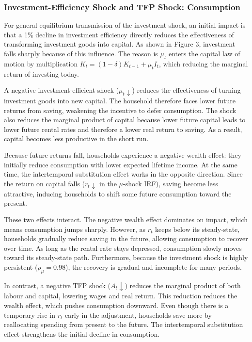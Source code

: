 \documentclass[12pt]{article}
\begin{document}
\subsubsection{Investment-Efficiency Shock and TFP Shock: Consumption}
For general equilibrium transmission of the investment shock, an initial impact is that a 1\% decline in investment efficiency directly reduces the effectiveness of transforming investment goods into capital. As shown in Figure 3, investment falls sharply because of this influence. The reason is $\mu_t$ enters the capital law of motion by multiplication $K_{t} = (1-\delta) K_{t-1} + \mu_t I_t$, which reducing the marginal return of investing today.

A negative investment-efficient shock ($\mu_t \downarrow$) reduces the effectiveness of turning investment goods into new capital. The household therefore faces lower future returns from saving, weakening the incentive to defer consumption. The shock also reduces the marginal product of capital because lower future capital leads to lower future rental rates and therefore a lower real return to saving. As a result, capital becomes less productive in the short run.

Because future returns fall, households experience a negative wealth effect: they initially reduce consumption with lower expected lifetime income. At the same time, the intertemporal substitution effect works in the opposite direction. Since the return on capital falls ($r_t \downarrow$ in the $\mu$-shock IRF), saving become less attractive, inducing households to shift some future consumption toward the present.

These two effects interact. The negative wealth effect dominates on impact, which means consumption jumps sharply. However, as $r_t$ keeps below its steady-state, households gradually reduce saving in the future, allowing consumption to recover over time. As long as the rental rate stays depressed, consumption slowly moves toward its steady-state path. Furthermore, because the investment shock is highly persistent ($\rho_{\mu} = 0.98$), the recovery is gradual and incomplete for many periods.

In contrast, a negative TFP shock ($A_t \downarrow$) reduces the marginal product of both labour and capital, lowering wages and real return. This reduction reduces the wealth effect, which pushes consumption downward. Even though there is a temporary rise in $r_t$ early in the adjustment, households save more by reallocating spending from present to the future. The intertemporal substitution effect strengthens the initial decline in consumption.
\end{document}
